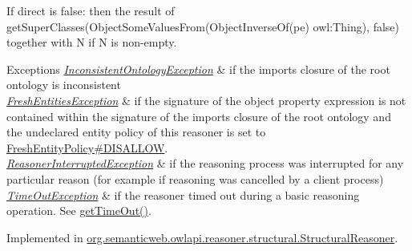 If {\ttfamily direct} is {\ttfamily false}\-: then the result of {\ttfamily get\-Super\-Classes(Object\-Some\-Values\-From(Object\-Inverse\-Of(pe) owl\-:Thing), false)} together with {\ttfamily N} if {\ttfamily N} is non-\/empty.


\begin{DoxyExceptions}{Exceptions}
{\em \hyperlink{classorg_1_1semanticweb_1_1owlapi_1_1reasoner_1_1_inconsistent_ontology_exception}{Inconsistent\-Ontology\-Exception}} & if the imports closure of the root ontology is inconsistent \\
\hline
{\em \hyperlink{classorg_1_1semanticweb_1_1owlapi_1_1reasoner_1_1_fresh_entities_exception}{Fresh\-Entities\-Exception}} & if the signature of the object property expression is not contained within the signature of the imports closure of the root ontology and the undeclared entity policy of this reasoner is set to \hyperlink{enumorg_1_1semanticweb_1_1owlapi_1_1reasoner_1_1_fresh_entity_policy_a762eae6d5b2449d125311ecaabfdc8d0}{Fresh\-Entity\-Policy\#\-D\-I\-S\-A\-L\-L\-O\-W}. \\
\hline
{\em \hyperlink{classorg_1_1semanticweb_1_1owlapi_1_1reasoner_1_1_reasoner_interrupted_exception}{Reasoner\-Interrupted\-Exception}} & if the reasoning process was interrupted for any particular reason (for example if reasoning was cancelled by a client process) \\
\hline
{\em \hyperlink{classorg_1_1semanticweb_1_1owlapi_1_1reasoner_1_1_time_out_exception}{Time\-Out\-Exception}} & if the reasoner timed out during a basic reasoning operation. See \hyperlink{interfaceorg_1_1semanticweb_1_1owlapi_1_1reasoner_1_1_o_w_l_reasoner_a44b2c968f989afe5290db29c90faa164}{get\-Time\-Out()}. \\
\hline
\end{DoxyExceptions}


Implemented in \hyperlink{classorg_1_1semanticweb_1_1owlapi_1_1reasoner_1_1structural_1_1_structural_reasoner_acd2d3a5c7395d3dcccabceccaad2cf99}{org.\-semanticweb.\-owlapi.\-reasoner.\-structural.\-Structural\-Reasoner}.

